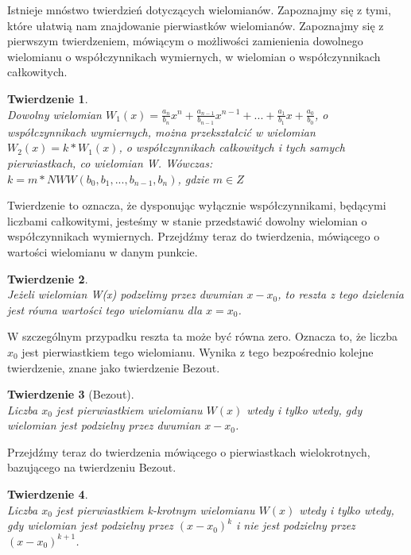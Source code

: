 \documentclass[oneside,a4paper]{book}
\newtheorem{theorem}{Twierdzenie}
\begin{document}
	Istnieje mnóstwo twierdzień dotyczących wielomianów. Zapoznajmy się z tymi, które ułatwią nam znajdowanie pierwiastków wielomianów. Zapoznajmy się z pierwszym twierdzeniem, mówiącym o możliwości zamienienia dowolnego wielomianu o współczynnikach wymiernych, w wielomian o współczynnikach całkowitych.
	
	\begin{theorem}
		$ $\\
		Dowolny wielomian $W_1(x) = \frac{a_n}{b_n}x^n + \frac{a_{n-1}}{b_{n-1}}x^{n-1} + ... + \frac{a_1}{b_1}x + \frac{a_0}{b_0}$, o współczynnikach wymiernych, można przekształcić w wielomian $W_2(x) = k * W_1(x)$, o współczynnikach całkowitych i tych samych pierwiastkach, co wielomian W. Wówczas: \\
		$k = m * NWW(b_0, b_1, ..., b_{n-1}, b_n)$, gdzie $m\in Z$
	\end{theorem}
	
	Twierdzenie to oznacza, że dysponując wyłącznie współczynnikami, będącymi liczbami całkowitymi, jesteśmy w stanie przedstawić dowolny wielomian o współczynnikach wymiernych. Przejdźmy teraz do twierdzenia, mówiącego o wartości wielomianu w danym punkcie.
	
	\begin{theorem}
		$ $\\
		Jeżeli wielomian W(x) podzelimy przez dwumian $x - x_0$, to reszta z tego dzielenia jest równa wartości tego wielomianu dla $x = x_0$.
	\end{theorem}
	
	W szczególnym przypadku reszta ta może być równa zero. Oznacza to, że liczba $x_0$ jest pierwiastkiem tego wielomianu. Wynika z tego bezpośrednio kolejne twierdzenie, znane jako twierdzenie Bezout.
	
	\begin{theorem}[Bezout]
		$ $\\
		Liczba $x_0$ jest pierwiastkiem wielomianu $W(x)$ wtedy i tylko wtedy, gdy wielomian jest podzielny przez dwumian $x - x_0$.
	\end{theorem}
	
	Przejdźmy teraz do twierdzenia mówiącego o pierwiastkach wielokrotnych, bazującego na twierdzeniu Bezout.
	
	\begin{theorem}
		$ $\\
		Liczba $x_0$ jest pierwiastkiem k-krotnym wielomianu $W(x)$ wtedy i tylko wtedy, gdy wielomian jest podzielny przez $(x - x_0)^k$ i nie jest podzielny przez $(x - x_0)^{k+1}$.
	\end{theorem}
	
\end{document}
